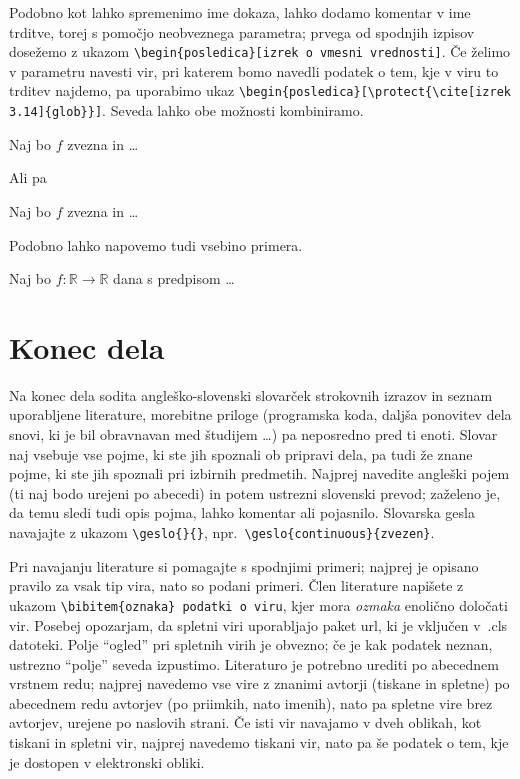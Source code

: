 \documentclass[mat1]{fmfdelo}
\newcommand{\R}{\mathbb R}
\begin{document}
Podobno kot lahko spremenimo ime dokaza, lahko dodamo komentar v ime trditve, torej s pomočjo neobveznega parametra; prvega od spodnjih izpisov dosežemo z ukazom
\verb|\begin{posledica}[izrek o vmesni vrednosti]|. Če želimo v parametru navesti vir, pri katerem bomo navedli podatek o tem, kje v viru to trditev najdemo, pa uporabimo ukaz \verb|\begin{posledica}[\protect{\cite[izrek 3.14]{glob}}]|. Seveda lahko obe možnosti kombiniramo. 


\begin{posledica}
Naj bo $f$ zvezna in \ldots
\end{posledica}

Ali pa

\begin{posledica}
Naj bo $f$ zvezna in \ldots
\end{posledica}

Podobno lahko napovemo tudi vsebino primera.

\begin{primer}
Naj bo $f \colon \R \to \R$ dana s predpisom \dots
\end{primer}

\section{Konec dela}

Na konec dela sodita angleško-slovenski slovarček strokovnih izrazov in seznam uporabljene literature, morebitne priloge (programska koda, daljša ponovitev dela snovi, ki je bil obravnavan med študijem \dots) pa neposredno pred ti enoti. Slovar naj vsebuje vse pojme, ki ste jih spoznali ob pripravi dela, pa tudi že znane pojme, ki ste jih spoznali pri izbirnih predmetih. Najprej navedite angleški pojem (ti naj bodo urejeni po abecedi) in potem ustrezni slovenski prevod; zaželeno je, da temu sledi tudi opis pojma, lahko komentar ali pojasnilo. Slovarska gesla navajajte z ukazom \verb|\geslo{}{}|, npr.\ \verb|\geslo{continuous}{zvezen}|.

Pri navajanju literature si pomagajte s spodnjimi primeri; najprej je opisano pravilo za vsak tip vira, nato so podani primeri. Člen literature napišete z ukazom \verb|\bibitem{oznaka} podatki o viru|, kjer mora \emph{ozmaka} enolično določati vir.  Posebej opozarjam, da spletni viri uporabljajo paket url, ki je vključen v~.cls datoteki. Polje ``ogled'' pri spletnih virih je obvezno; če je kak podatek neznan, ustrezno ``polje'' seveda izpustimo. Literaturo je potrebno urediti po abecednem vrstnem redu; najprej navedemo vse vire z znanimi avtorji (tiskane in spletne)  po abecednem redu avtorjev (po priimkih, nato imenih), nato pa spletne vire brez avtorjev, urejene po naslovih strani. Če isti vir navajamo v dveh oblikah, kot tiskani in spletni vir, najprej navedemo tiskani vir, nato pa še podatek o tem, kje je dostopen v elektronski obliki.
\end{document}
